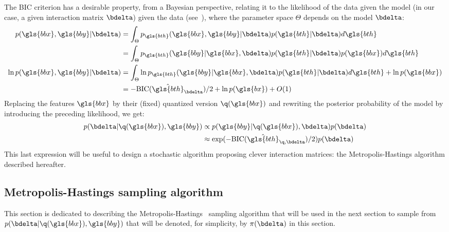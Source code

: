 The BIC criterion has a desirable property, from a Bayesian perspective, relating it to the likelihood of the data given the model (in our case, a given interaction matrix $\bdelta$) given the data (see~\cite{lebarbier}), where the parameter space $\Theta$ depends on the model $\bdelta$:
\begin{align*}
p(\gls{bbx}, \gls{bby} | \bdelta) & = \int_{\Theta} p_{\gls{bth}}(\gls{bbx}, \gls{bby} | \bdelta) p(\gls{bth} | \bdelta)d\gls{bth} \\
 & = \int_{\Theta} p_{\gls{bth}}(\gls{bby} | \gls{bbx}, \bdelta) p(\gls{bth} | \bdelta) p(\gls{bbx}) d\gls{bth} \\
\ln p(\gls{bbx}, \gls{bby} | \bdelta) & = \int_{\Theta} \ln p_{\gls{bth}}(\gls{bby} | \gls{bbx}, \bdelta) p(\gls{bth} | \bdelta) d\gls{bth} + \ln p(\gls{bbx}) \\
 & = -\text{BIC}(\hat{\gls{bth}}_{\bdelta})/2 + \ln p(\gls{bx}) + O(1)
\end{align*}
Replacing the features $\gls{bbx}$ by their (fixed) quantized version $\q(\gls{bbx})$ and rewriting the posterior probability of the model by introducing the preceding likelihood, we get:
\begin{align*}
p(\bdelta | \q(\gls{bbx}),\gls{bby}) & \propto p(\gls{bby} | \q(\gls{bbx}), \bdelta) p(\bdelta) \\
& \approx \exp(-\text{BIC}(\hat{\gls{bth}}_{\q,\bdelta})/2) p(\bdelta)
\end{align*}
This last expression will be useful to design a stochastic algorithm proposing clever interaction matrices: the Metropolis-Hastings algorithm described hereafter.

\subsection{Metropolis-Hastings sampling algorithm}

This section is dedicated to describing the Metropolis-Hastings~\cite{hastings1970monte} sampling algorithm that will be used in the next section to sample from $p(\bdelta | \q(\gls{bbx}),\gls{bby})$ that will be denoted, for simplicity, by $\pi(\bdelta)$ in this section.

